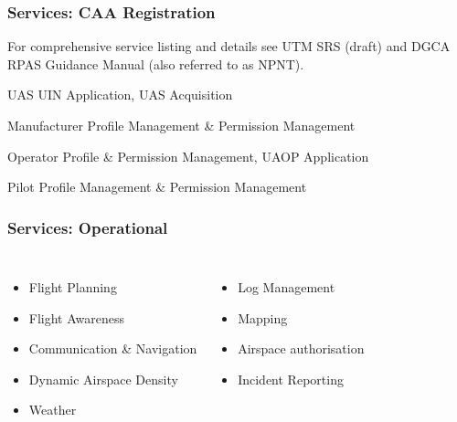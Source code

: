 \documentclass[usenames,dvipsnames,aspectratio=169,serif]{beamer}
\begin{document}

\begin{frame}
   \frametitle{Services: CAA Registration}
   For comprehensive service listing and details see UTM SRS (draft) \cite{UTMWG-SRS} and DGCA RPAS Guidance Manual \cite{RPASGM2020} (also referred to as NPNT).
   \begin{block}{UAS}
      UIN Application, UAS Acquisition
   \end{block}

   \begin{block}{Manufacturer}
      Profile Management \& Permission Management
   \end{block}

   \begin{block}{Operator}
      Profile \& Permission Management, UAOP Application
   \end{block}

   \begin{block}{Pilot}
      Profile Management \& Permission Management
   \end{block}
\end{frame}


\begin{frame}
   \frametitle{Services: Operational}
   \begin{columns}[t] %

      \begin{itemize}
         \item Flight Planning
         \item Flight Awareness
         \item Communication \& Navigation
         \item Dynamic Airspace Density
         \item Weather
      \end{itemize}

      \begin{itemize}
         \item Log Management
         \item Mapping
         \item Airspace authorisation
         \item Incident Reporting
      \end{itemize}
   \end{columns}
\end{frame}
\end{document}

